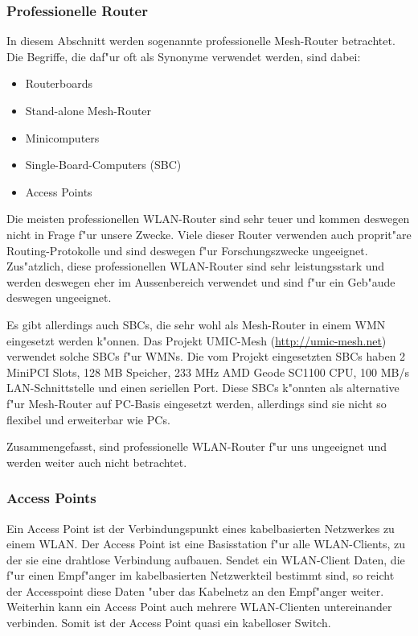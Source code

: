 \subsubsection{Professionelle Router}

In diesem Abschnitt werden sogenannte professionelle Mesh-Router betrachtet. 
Die Begriffe, die daf"ur oft als Synonyme verwendet werden, sind dabei: 

\begin{itemize}	
\item Routerboards
\item Stand-alone Mesh-Router 
\item Minicomputers 
\item Single-Board-Computers (SBC) 
\item Access Points
\end{itemize}

Die meisten professionellen WLAN-Router sind sehr teuer und kommen deswegen
nicht in Frage f"ur unsere Zwecke. Viele dieser Router verwenden auch
proprit"are Routing-Protokolle und sind deswegen f"ur Forschungszwecke
ungeeignet. Zus"atzlich, diese professionellen WLAN-Router sind sehr
leistungsstark und werden deswegen eher im Aussenbereich verwendet und
sind f"ur ein Geb"aude deswegen ungeeignet.

Es gibt allerdings auch SBCs, die sehr wohl als Mesh-Router in einem WMN
eingesetzt werden k"onnen. Das Projekt UMIC-Mesh (\url{http://umic-mesh.net})
verwendet solche SBCs f"ur WMNs. Die vom Projekt eingesetzten SBCs
haben 2 MiniPCI Slots, 128 MB Speicher, 233 MHz AMD Geode SC1100 CPU,
100 MB/s LAN-Schnittstelle und einen seriellen Port. Diese SBCs k"onnten
als alternative f"ur Mesh-Router auf PC-Basis eingesetzt werden, allerdings
sind sie nicht so flexibel und erweiterbar wie PCs.

Zusammengefasst, sind professionelle WLAN-Router f"ur uns ungeeignet und werden
weiter auch nicht betrachtet.

\subsubsection{Access Points}

Ein Access Point ist der Verbindungspunkt eines kabelbasierten
Netzwerkes zu einem WLAN. Der Access Point ist eine Basisstation f"ur alle
WLAN-Clients, zu der sie eine drahtlose Verbindung aufbauen.
Sendet ein WLAN-Client Daten, die f"ur einen Empf"anger im kabelbasierten
Netzwerkteil bestimmt sind, so reicht der Accesspoint diese Daten "uber
das Kabelnetz an den Empf"anger weiter. Weiterhin kann ein Access Point
auch mehrere WLAN-Clienten untereinander verbinden. Somit ist der Access Point
quasi ein kabelloser Switch.

